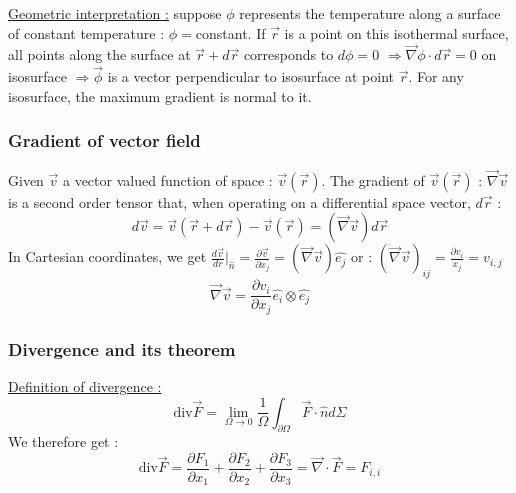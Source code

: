 \documentclass[../main.tex]{subfiles}
\begin{document}
\color{gray}\underline{Geometric interpretation :} suppose $\phi$ represents the temperature along a surface of constant temperature : $\phi =$constant. If $\Vec{r}$ is a point on this isothermal surface, all points along the surface at $\Vec{r}+d\Vec{r}$ corresponds to $d\phi=0$ $\Rightarrow \Vec{\nabla}\phi \cdot d\Vec{r} = 0$ on isosurface $\Rightarrow \Vec{\phi}$ is a vector perpendicular to isosurface at point $\Vec{r}$. For any isosurface, the maximum gradient is normal to it.\color{black}\\

 \subsubsection{Gradient of vector field}
\quad Given $\Vec{v}$ a vector valued function of space : $\Vec{v}(\Vec{r})$. The gradient of $\Vec{v}(\Vec{r})$ : $\Vec{\nabla} \Vec{v}$ is a second order tensor that, when operating on a differential space vector, $d\Vec{r}$ : \\
\begin{equation}
    d\Vec{v} = \Vec{v}(\Vec{r}+d\Vec{r})-\Vec{v}(\Vec{r}) = (\Vec{\nabla}\Vec{v})d\Vec{r}
\end{equation}
In Cartesian coordinates, we get $\frac{d\Vec{v}}{dr}\rvert_{\hat{n}} = \frac{\partial\Vec{v}}{\partial x_j} = (\Vec{\nabla} \Vec{v})\hat{e_j}$ or : $(\Vec{\nabla}\Vec{v})_{ij} = \frac{\partial v_i}{x_j} = v_{i,j}$\\
\begin{equation}
    \Vec{\nabla} \Vec{v} = \frac{\partial v_i}{\partial x_j} \hat{e_i}\otimes \hat{e_j}
\end{equation}

\subsubsection{Divergence and its theorem}
\quad \underline{Definition of divergence :} \\
\begin{equation}
    \text{div} \Vec{F} = \lim_{\Omega \rightarrow 0} \frac{1}{\Omega} \int_{\partial \Omega} \Vec{F}\cdot \hat{n}d\Sigma
\end{equation}
We therefore get : \\
\begin{equation}
    \text{div}\Vec{F} = \frac{\partial F_1}{\partial x_1} + \frac{\partial F_2}{\partial x_2} + \frac{\partial F_3}{\partial x_3} = \Vec{\nabla} \cdot \Vec{F} = F_{i,i}
\end{equation}
\end{document}
